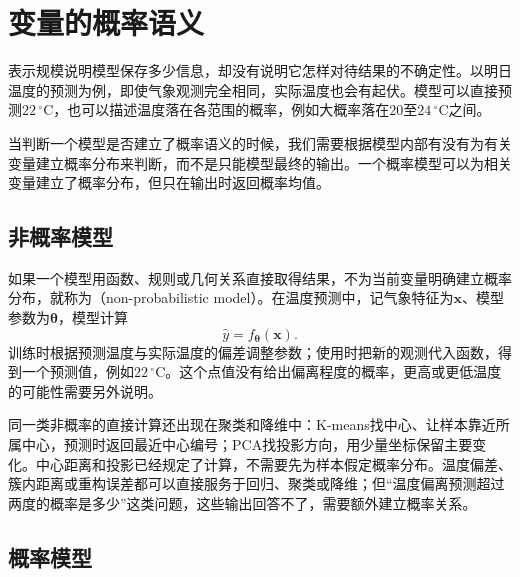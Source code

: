 \section{变量的概率语义}
\label{sec:models-probability}

表示规模说明模型保存多少信息，却没有说明它怎样对待结果的不确定性。以明日温度的预测为例，即使气象观测完全相同，实际温度也会有起伏。模型可以直接预测$22\,^{\circ}\mathrm{C}$，也可以描述温度落在各范围的概率，例如大概率落在$20$至$24\,^{\circ}\mathrm{C}$之间。

当判断一个模型是否建立了概率语义的时候，我们需要根据模型内部有没有为有关变量建立概率分布来判断，而不是只能模型最终的输出。一个概率模型可以为相关变量建立了概率分布，但只在输出时返回概率均值。

\subsection{非概率模型}
\label{sec:models-nonprobabilistic}

如果一个模型用函数、规则或几何关系直接取得结果，不为当前变量明确建立概率分布，就称为（non-probabilistic model）。在温度预测中，记气象特征为$\bm{x}$、模型参数为$\bm{\theta}$，模型计算
\begin{equation}
  \hat{y}=f_{\bm{\theta}}(\bm{x}).
  \label{eq:models-point-prediction}
\end{equation}
训练时根据预测温度与实际温度的偏差调整参数；使用时把新的观测代入函数，得到一个预测值，例如$22\,^{\circ}\mathrm{C}$。这个点值没有给出偏离程度的概率，更高或更低温度的可能性需要另外说明。

同一类非概率的直接计算还出现在聚类和降维中：K-means找中心、让样本靠近所属中心，预测时返回最近中心编号；PCA找投影方向，用少量坐标保留主要变化。中心距离和投影已经规定了计算，不需要先为样本假定概率分布。温度偏差、簇内距离或重构误差都可以直接服务于回归、聚类或降维；但“温度偏离预测超过两度的概率是多少”这类问题，这些输出回答不了，需要额外建立概率关系。

\subsection{概率模型}
\label{sec:models-probabilistic}

